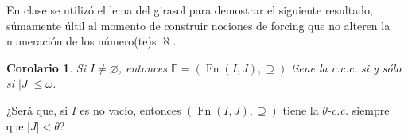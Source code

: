 \documentclass[letterpaper,DIV=15,12pt]{scrartcl}
\newtheorem{corolario}{Corolario}
\renewcommand{\emptyset}{\varnothing}
\begin{document}
    En clase se utilizó el lema del girasol para demostrar el siguiente resultado, súmamente últil al momento de construir nociones de forcing que no alteren la numeración de los número(te)s $\aleph$.

    \begin{corolario}
        Si $I \neq \emptyset$, entonces $\mathbb{P}=(\operatorname*{Fn}(I,J),\supseteq)$ tiene la \textit{c.c.c.} si y sólo si $|J| \leq \omega$.
    \end{corolario}

    ¿Será que, si $I$ es no vacío, entonces $(\operatorname*{Fn}(I,J),\supseteq)$ tiene la $\theta$-\textit{c.c.} siempre que $|J|<\theta$?
\end{document}
